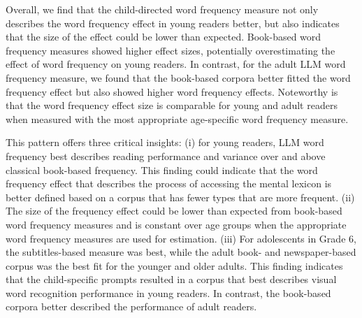 \documentclass[doc, a4paper]{apa7}
\begin{document}
Overall, we find that the child-directed word frequency measure not only describes the word frequency effect in young readers better, but also indicates that the size of the effect could be lower than expected. Book-based word frequency measures showed higher effect sizes, potentially overestimating the effect of word frequency on young readers. In contrast, for the adult LLM word frequency measure, we found that the book-based corpora better fitted the word frequency effect but also showed higher word frequency effects. Noteworthy is that the word frequency effect size is comparable for young and adult readers when measured with the most appropriate age-specific word frequency measure. 

This pattern offers three critical insights: (i) for young readers, LLM word frequency best describes reading performance and variance over and above classical book-based frequency. This finding could indicate that the word frequency effect that describes the process of accessing the mental lexicon \citep{brysbaert_word_2018, brysbaert_word_2011} is better defined based on a corpus that has fewer types that are more frequent. (ii) The size of the frequency effect could be lower than expected from book-based word frequency measures and is constant over age groups when the appropriate word frequency measures are used for estimation. 
(iii) For adolescents in Grade 6, the subtitles-based measure was best, while the adult book- and newspaper-based corpus was the best fit for the younger and older adults. This finding indicates that the child-specific prompts resulted in a corpus that best describes visual word recognition performance in young readers. In contrast, the book-based corpora better described the performance of adult readers.  
\end{document}
